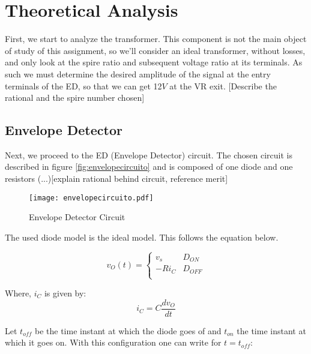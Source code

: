 \section{Theoretical Analysis}
\label{sec:theoretical}

First, we start to analyze the transformer. This component is not the main object of study of this assignment, so we'll consider an ideal transformer, without losses, and only look at the spire ratio and subsequent voltage ratio at its terminals. As such we must determine the desired amplitude of the signal at the entry terminals of the ED, so that we can get 12$V$ at the VR exit. [Describe the rational and the spire number chosen]  %

\subsection{Envelope Detector}

Next, we proceed to the ED (Envelope Detector) circuit. The chosen circuit is described in figure \ref{fig:envelopecircuito} and is composed of one diode and one resistors (...)[explain rational behind circuit, reference merit]

\begin{figure}[h]
\centering
\texttt{[image: envelopecircuito.pdf]}
\caption{Envelope Detector Circuit}
\label{fig:envelope}
\end{figure}


The used diode model is the ideal model. This follows the equation below.

\begin{equation}
	v_O(t) = \left\{
	\begin{array}{ll}
		v_s & D_{ON} \\
	 -R i_C & D_{OFF}\\
  \end{array}
\right.
\end{equation}

Where, $i_C$ is given by:
\begin{equation}
  i_C=C \frac{d v_O}{dt}
\end{equation}

Let $t_{off}$ be the time instant at which the diode goes of and $t_{on}$ the time instant at which it goes on. With this configuration one can write for $t=t_{off}$:

